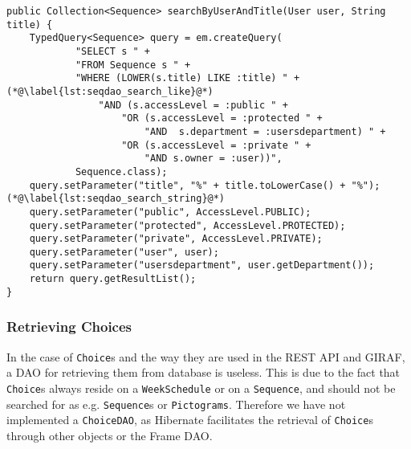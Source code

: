 \begin{lstlisting}[float, floatplacement=h, caption={The method in \texttt{SequenceDaoImpl} which allows for \texttt{Sequence}s to be searched for by title}, label={lst:seqdao_search}]
public Collection<Sequence> searchByUserAndTitle(User user, String title) {
    TypedQuery<Sequence> query = em.createQuery(
            "SELECT s " +
            "FROM Sequence s " +
            "WHERE (LOWER(s.title) LIKE :title) " +(*@\label{lst:seqdao_search_like}@*)
                "AND (s.accessLevel = :public " +
                    "OR (s.accessLevel = :protected " +
                        "AND  s.department = :usersdepartment) " +
                    "OR (s.accessLevel = :private " +
                        "AND s.owner = :user))",
            Sequence.class);
    query.setParameter("title", "%" + title.toLowerCase() + "%");(*@\label{lst:seqdao_search_string}@*)
    query.setParameter("public", AccessLevel.PUBLIC);
    query.setParameter("protected", AccessLevel.PROTECTED);
    query.setParameter("private", AccessLevel.PRIVATE);
    query.setParameter("user", user);
    query.setParameter("usersdepartment", user.getDepartment());
    return query.getResultList();
}
\end{lstlisting}

\subsubsection{Retrieving Choices}
In the case of \texttt{Choice}s and the way they are used in the REST API and GIRAF, a DAO for retrieving them from database is useless.
This is due to the fact that \texttt{Choice}s always reside on a \texttt{WeekSchedule} or on a \texttt{Sequence}, and should not be searched for as e.g. \texttt{Sequence}s or \texttt{Pictograms}.
Therefore we have not implemented a \texttt{ChoiceDAO}, as Hibernate facilitates the retrieval of \texttt{Choice}s through other objects or the Frame DAO.
